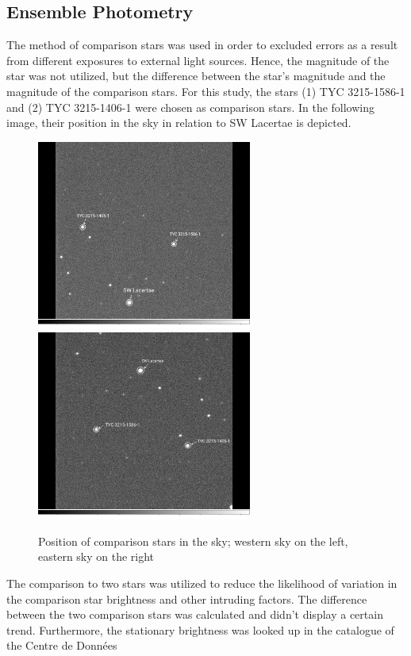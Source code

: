 \subsection{Ensemble Photometry}
  \label{sec:great}
  The method of comparison stars was used in order to excluded errors as a result 
  from different exposures to external light sources. 
  Hence, the magnitude of the star was not utilized, but the difference between the star’s 
  magnitude and the magnitude of the comparison stars. For this study, the stars 
  (1) TYC 3215-1586-1 and (2) TYC 3215-1406-1 were chosen as comparison stars. 
  In the following image, their position in the sky in relation to SW Lacertae
  is depicted.
  \begin{figure}[H]
    \centering
    \includegraphics[width=200pt]{WestHA~2.jpg}
    \hspace{1em}
    \includegraphics[width=200pt]{EastHA~2.jpg}
    \caption{Position of comparison stars in the sky; western sky on the left, eastern sky on the right}
    \label{fig:plot}
  \end{figure}
  \noindent The comparison to two stars was utilized to reduce the likelihood of 
  variation in the comparison star brightness and other intruding factors. The difference
  between the two comparison stars was calculated and didn't display a certain trend.
  Furthermore, the stationary brightness was looked up in the catalogue of the Centre de Données 
